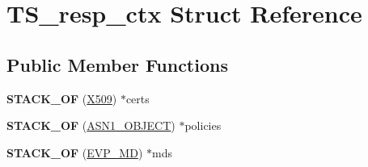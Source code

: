 \hypertarget{struct_t_s__resp__ctx}{}\section{T\+S\+\_\+resp\+\_\+ctx Struct Reference}
\label{struct_t_s__resp__ctx}
\subsection*{Public Member Functions}
\begin{DoxyCompactItemize}
\item 
\mbox{\label{struct_t_s__resp__ctx_acca3532e1fe120037b15c9069787ebb5}} 
{\bfseries S\+T\+A\+C\+K\+\_\+\+OF} (\hyperlink{structx509__st}{X509}) $\ast$certs
\item 
\mbox{\label{struct_t_s__resp__ctx_a042ada8c5f09433ffef7a94fd1143ccf}} 
{\bfseries S\+T\+A\+C\+K\+\_\+\+OF} (\hyperlink{structasn1__object__st}{A\+S\+N1\+\_\+\+O\+B\+J\+E\+CT}) $\ast$policies
\item 
\mbox{\label{struct_t_s__resp__ctx_a753cb9f6a9ec57b7fb95dbb24774c058}} 
{\bfseries S\+T\+A\+C\+K\+\_\+\+OF} (\hyperlink{structenv__md__st}{E\+V\+P\+\_\+\+MD}) $\ast$mds
\end{DoxyCompactItemize}
